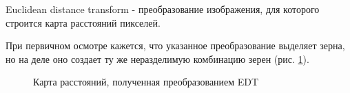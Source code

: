 \documentclass[a4paper, 14pt]{article}
\begin{document}
	Euclidean distance transform - преобразование изображения, для которого строится карта расстояний пикселей. 
	
	При первичном осмотре кажется, что указанное преобразование выделяет зерна, но на деле оно создает ту же неразделимую 
	комбинацию зерен (рис. \ref{edt}).
	
	\begin{figure}[h]
		\begin{center}
			\begin{minipage}[h]{0.3\linewidth}
				\caption{Карта расстояний, полученная преобразованием EDT}
				\label{edt}
			\end{minipage}
			\hfill
			\begin{minipage}[h]{0.5\linewidth}

\end{minipage}
\end{center}
\end{figure}
\end{document}
